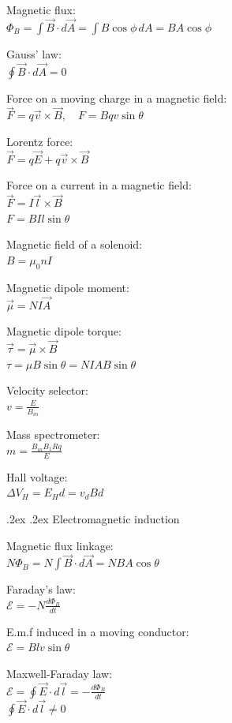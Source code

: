 \documentclass[10pt,landscape,a4paper]{article}
\makeatletter
\renewcommand{\section}{\@startsection{section}{1}{0mm}%
  {.2ex}%
  {.2ex}%
  {\color{myblue}\sffamily\small\bfseries}}
\makeatother
\begin{document}
\begin{multicols*}{5}
  Magnetic flux: \\
  \(\Phi_B = \int \vec{B} \cdot d \vec{A} = \int B \cos \phi \, dA = BA \cos \phi\)

  Gauss' law: \\
  \(\oint \vec{B} \cdot d \vec{A} = 0\)

  Force on a moving charge in a magnetic field: \\
  \(\vec{F} = q \vec{v} \times \vec{B}, \quad F = Bqv \sin \theta\)

  Lorentz force: \\
  \(\vec{F} = q \vec{E} + q \vec{v} \times \vec{B}\)

  Force on a current in a magnetic field: \\
  \(\vec{F} = I \vec{l} \times \vec{B}\) \\
  \(F = BIl \sin \theta\)

  Magnetic field of a solenoid: \\
  \(B = \mu_0 n I\)

  Magnetic dipole moment: \\
  \(\vec{\mu} = NI \vec{A}\)

  Magnetic dipole torque: \\
  \(\vec{\tau} = \vec{\mu} \times \vec{B}\) \\
  \(\tau = \mu B \sin \theta = NIAB \sin \theta\)

  Velocity selector: \\
  \(v = \frac{E}{B_{in}}\)

  Mass spectrometer: \\
  \(m = \frac{B_{in}B_1 Rq}{E}\)

  Hall voltage: \\
  \(\Delta V_H = E_H d = v_d B d\)


  \section{Electromagnetic induction}

  Magnetic flux linkage: \\
  \(N \Phi_B = N \int \vec{B} \cdot d \vec{A} = NBA \cos \theta\)

  Faraday's law: \\
  \(\mathcal{E} = -N \frac{d \Phi_B}{dt}\)

  E.m.f induced in a moving conductor: \\
  \(\mathcal{E} = Blv \sin \theta\)

  Maxwell-Faraday law: \\
  \(\mathcal{E} = \oint \vec{E} \cdot d \vec{l} = - \frac{d \Phi_B} {dt}\) \\
  \(\oint \vec{E} \cdot d \vec{l} \ne 0\)


\end{multicols*}
\end{document}

